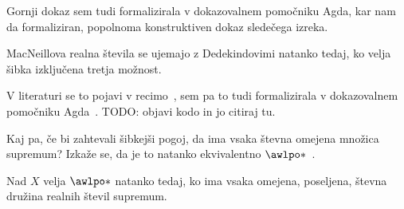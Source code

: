 Gornji dokaz sem tudi formalizirala v dokazovalnem pomočniku Agda, kar nam da
formaliziran, popolnoma konstruktiven dokaz sledečega izreka.
\begin{izrek}\label{th:Rm=Rd-wlem}
  MacNeillova realna števila se ujemajo z Dedekindovimi natanko tedaj, ko velja
  šibka izključena tretja možnost.
\end{izrek}

V literaturi se to pojavi v recimo~\cite[trd.~D4.7.11]{Johnstone02}, sem pa to
tudi formalizirala v dokazovalnem pomočniku Agda~\cite{Strah25}.
TODO: objavi kodo in jo citiraj tu.

Kaj pa, če bi zahtevali šibkejši pogoj, da ima vsaka števna omejena množica
supremum? Izkaže se, da je to natanko ekvivalentno
\(\awlpo*\)~\cite[vaja~3N.5]{GJ60}.

\begin{trditev}
  Nad \(X\) velja \(\awlpo*\) natanko tedaj, ko ima vsaka omejena, poseljena,
  števna družina realnih števil supremum.
\end{trditev}


